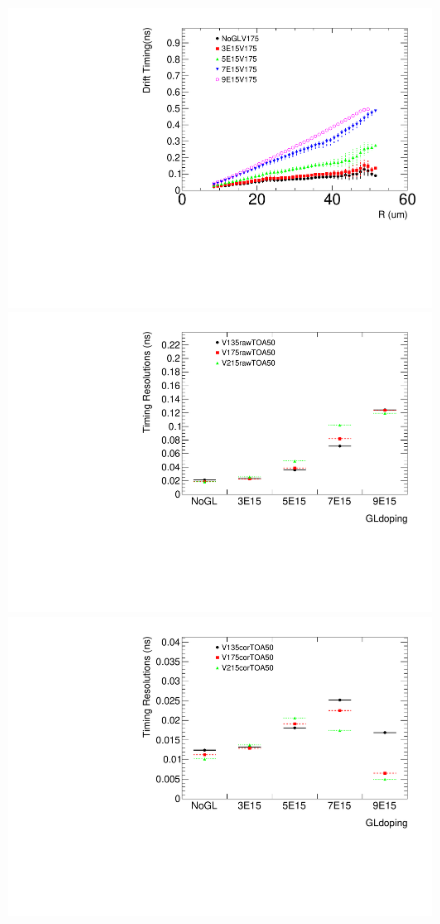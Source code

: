 \documentclass[aps,pt14,superscriptaddress,showpacs,floatfix,nofootinbib]{revtex4}
\begin{document}
\begin{figure}[hbtp]
\begin{center}
\includegraphics[width=0.25\textheight,keepaspectratio]{figures/Anatiming_timing3DIBLGAD5E_Plots_V175.pdf}
\includegraphics[width=0.25\textheight,keepaspectratio]{figures/Anatiming_timing3DIBLGAD5E_Plots_rawTOA50GLdoping.pdf}
\includegraphics[width=0.25\textheight,keepaspectratio]{figures/Anatiming_timing3DIBLGAD5E_Plots_corTOA50GLdoping.pdf}

\end{center}
\end{figure}
\end{document}
